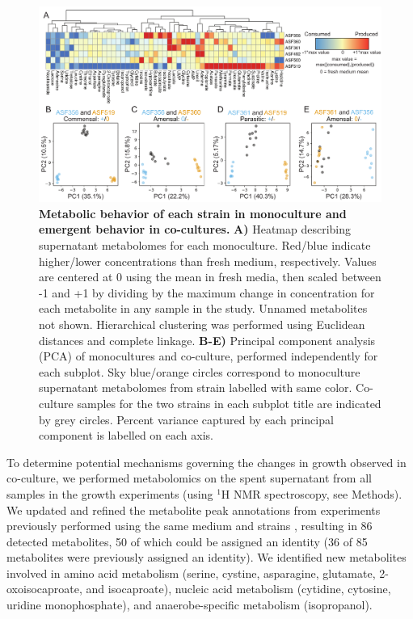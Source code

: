 \documentclass[11pt,twocolumn,notitlepage,openany,twoside]{book}
\begin{document}
\begin{refsection}
\begin{figure}[t]
\centering
\includegraphics[width=\textwidth]{ch2_fig3}
\caption[Metabolic behavior of each strain in monoculture and emergent behavior in co-cultures.]{\textbf{Metabolic behavior of each strain in monoculture and emergent behavior in co-cultures.} \textbf{A)} Heatmap describing supernatant metabolomes for each monoculture. Red/blue indicate higher/lower concentrations than fresh medium, respectively. Values are centered at 0 using the mean in fresh media, then scaled between -1 and +1 by dividing by the maximum change in concentration for each metabolite in any sample in the study. Unnamed metabolites not shown. Hierarchical clustering was performed using Euclidean distances and complete linkage. \textbf{B-E)} Principal component analysis (PCA) of monocultures and co-culture, performed independently for each subplot. Sky blue/orange circles correspond to monoculture supernatant metabolomes from strain labelled with same color. Co-culture samples for the two strains in each subplot title are indicated by grey circles. Percent variance captured by each principal component is labelled on each axis.}
\end{figure}

To determine potential mechanisms governing the changes in growth observed in co-culture, we performed metabolomics on the spent supernatant from all samples in the growth experiments (using  $^1\!$H NMR spectroscopy, see Methods). We updated and refined the metabolite peak annotations from experiments previously performed using the same medium and strains \cite{Biggs2017-fs}, resulting in 86 detected metabolites, 50 of which could be assigned an identity (36 of 85 metabolites were previously assigned an identity). We identified new metabolites involved in amino acid metabolism (serine, cystine, asparagine, glutamate, 2-oxoisocaproate, and isocaproate), nucleic acid metabolism (cytidine, cytosine, uridine monophosphate), and anaerobe-specific metabolism (isopropanol).


\end{refsection}
\end{document}
